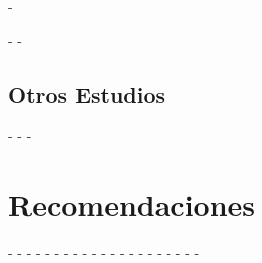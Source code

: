 -\documentclass[10pt,a4paper]{moderncv}
\begin{document}
	-
	-\subsection{Otros Estudios}
	-%
	-
	-\section{Recomendaciones}
	-\cvline{}{\small }
	-
	-\closesection{}                   %
	-\renewcommand{\listitemsymbol}{-} %
	-
	-%
	-%
	-%
	-%
	-
	-%
	-%
	-%
	-%
	-
	-%
	-%
	-%
	-%
	-
	-
\end{document}
